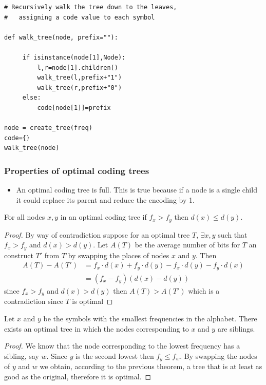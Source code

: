 \documentclass{beamer}
\begin{document}
\begin{frame}[fragile]
\begin{lstlisting}[numbers=none]
# Recursively walk the tree down to the leaves,
#   assigning a code value to each symbol

def walk_tree(node, prefix=""):

     if isinstance(node[1],Node):
         l,r=node[1].children()
         walk_tree(l,prefix+"1")
         walk_tree(r,prefix+"0")
     else:
         code[node[1]]=prefix

node = create_tree(freq)
code={}
walk_tree(node)

\end{lstlisting}
\end{frame}



\begin{frame}
  \frametitle{Properties of optimal coding trees}
  \begin{itemize}
    \item An optimal coding tree is full. This is true because if a node is a single child it could replace its parent and reduce the encoding by 1.
  \end{itemize}
     \begin{theorem}
     For all nodes $x,y$ in an optimal coding tree if $f_x>f_y$ then $d(x)\le d(y)$.
    \end{theorem}  
    \begin{proof}
      By way of contradiction suppose for an optimal tree $T$, $\exists x,y$ such that $f_x>f_y$ and $d(x)> d(y)$. Let $A(T)$ be the average number of bits for $T$ an construct $T'$ from $T$ by swapping the places of nodes $x$ and $y$. Then 
      \begin{align*}
        A(T)-A(T')&=f_x\cdot d(x)+f_y\cdot d(y)-f_x\cdot d(y)-f_y\cdot d(x)\\
        &=(f_x-f_y)(d(x)-d(y))
      \end{align*}
      since $f_x>f_y$ and $d(x)>d(y)$ then $A(T)>A(T')$ which is a contradiction since $T$ is optimal
    \end{proof}
  

\end{frame}
\begin{frame}
  \begin{theorem}
  Let $x$ and $y$ be the symbols with the smallest frequencies in the alphabet. There exists an optimal tree in which the nodes corresponding to $x$ and $y$ are siblings.
  \end{theorem}
  \begin{proof}
    We know that the node corresponding to the lowest frequency has a sibling, say $w$. Since $y$ is the second lowest then $f_y\le f_w$. By swapping the nodes of $y$ and $w$ we obtain, according to the previous theorem, a tree that is at least as good as the original, therefore it is optimal.
  \end{proof}
\end{frame}
\end{document}
